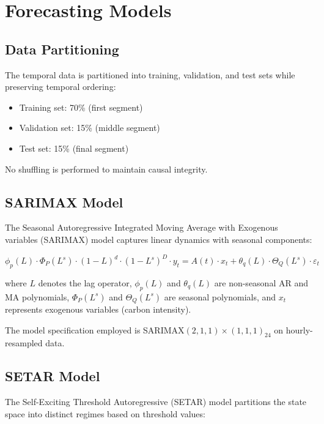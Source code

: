 \documentclass[12pt]{report}
\begin{document}
\section{Forecasting Models}

\subsection{Data Partitioning}

The temporal data is partitioned into training, validation, and test sets while preserving temporal ordering:

\begin{itemize}
    \item Training set: 70\% (first segment)
    \item Validation set: 15\% (middle segment)
    \item Test set: 15\% (final segment)
\end{itemize}

No shuffling is performed to maintain causal integrity.

\subsection{SARIMAX Model}

The Seasonal Autoregressive Integrated Moving Average with Exogenous variables (SARIMAX) model captures linear dynamics with seasonal components:

\begin{equation}
\phi_p(L) \cdot \Phi_P(L^s) \cdot (1-L)^d \cdot (1-L^s)^D \cdot y_t = A(t) \cdot x_t + \theta_q(L) \cdot \Theta_Q(L^s) \cdot \varepsilon_t
\end{equation}

where $L$ denotes the lag operator, $\phi_p(L)$ and $\theta_q(L)$ are non-seasonal AR and MA polynomials, $\Phi_P(L^s)$ and $\Theta_Q(L^s)$ are seasonal polynomials, and $x_t$ represents exogenous variables (carbon intensity).

The model specification employed is SARIMAX$(2,1,1) \times (1,1,1)_{24}$ on hourly-resampled data.

\subsection{SETAR Model}

The Self-Exciting Threshold Autoregressive (SETAR) model partitions the state space into distinct regimes based on threshold values:
\end{document}
